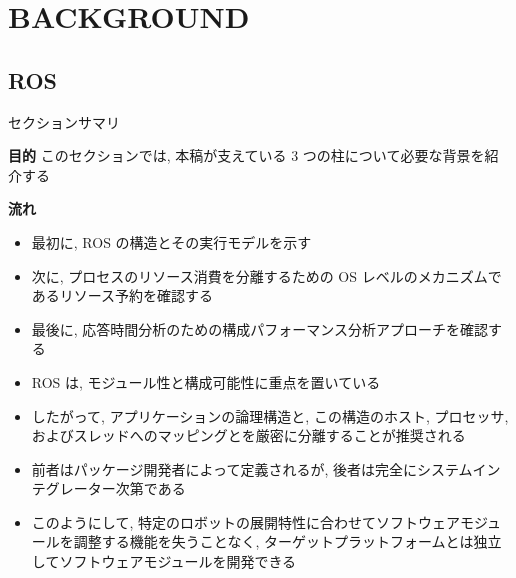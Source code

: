 
\section{BACKGROUND}
\label{sec: background}


\subsection{ROS}
\label{ssec: ros}

\begin{frame}{セクションサマリ}
    \begin{itembox}[l]{\textbf{目的}}
        このセクションでは, 本稿が支えている 3 つの柱について必要な背景を紹介する
    \end{itembox}
    \begin{itembox}[l]{\textbf{流れ}}
        \begin{itemize}
            \item 最初に, ROS の構造とその実行モデルを示す
            \item 次に, プロセスのリソース消費を分離するための OS レベルのメカニズムであるリソース予約を確認する
            \item 最後に, 応答時間分析のための構成パフォーマンス分析アプローチを確認する
        \end{itemize}
    \end{itembox}
\end{frame}

\begin{frame}{}
    \begin{itemize}
        \item ROS は, モジュール性と構成可能性に重点を置いている
        \item したがって, アプリケーションの論理構造と, この構造のホスト, プロセッサ, およびスレッドへのマッピングとを厳密に分離することが推奨される
        \item 前者はパッケージ開発者によって定義されるが, 後者は完全にシステムインテグレーター次第である
        \item このようにして, 特定のロボットの展開特性に合わせてソフトウェアモジュールを調整する機能を失うことなく, ターゲットプラットフォームとは独立してソフトウェアモジュールを開発できる
    \end{itemize}
\end{frame}

